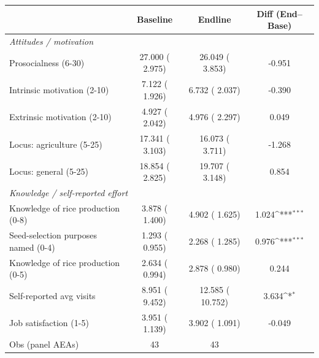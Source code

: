 \def\sym#1{\ifmmode^{#1}\else\(^{#1}\)\fi}
\begin{tabular}{lccc}
\toprule
 & Baseline & Endline & Diff (End--Base) \\
\midrule
\multicolumn{4}{l}{\textit{Attitudes / motivation}}\\
Prosocialness (6-30) &    27.000 (    2.975) &    26.049 (    3.853) &    -0.951 \\
Intrinsic motivation (2-10) &     7.122 (    1.926) &     6.732 (    2.037) &    -0.390 \\
Extrinsic motivation (2-10) &     4.927 (    2.042) &     4.976 (    2.297) &     0.049 \\
Locus: agriculture (5-25) &    17.341 (    3.103) &    16.073 (    3.711) &    -1.268 \\
Locus: general (5-25) &    18.854 (    2.825) &    19.707 (    3.148) &     0.854 \\
\multicolumn{4}{l}{\textit{Knowledge / self-reported effort}}\\
Knowledge of rice production (0-8) &     3.878 (    1.400) &     4.902 (    1.625) &     1.024\sym{***} \\
Seed-selection purposes named (0-4) &     1.293 (    0.955) &     2.268 (    1.285) &     0.976\sym{***} \\
Knowledge of rice production (0-5) &     2.634 (    0.994) &     2.878 (    0.980) &     0.244 \\
Self-reported avg visits &     8.951 (    9.452) &    12.585 (   10.752) &     3.634\sym{*} \\
Job satisfaction (1-5) &     3.951 (    1.139) &     3.902 (    1.091) &    -0.049 \\
\midrule
Obs (panel AEAs) & 43 & 43 & \\
\bottomrule
\end{tabular}
